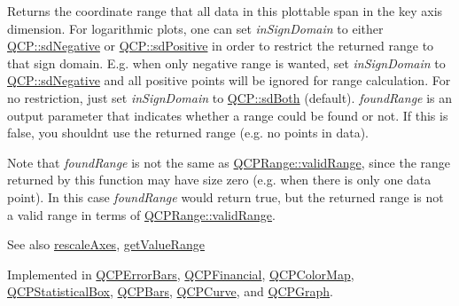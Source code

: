 Returns the coordinate range that all data in this plottable span in the key axis dimension. For logarithmic plots, one can set {\itshape in\+Sign\+Domain} to either \mbox{\hyperlink{namespace_q_c_p_afd50e7cf431af385614987d8553ff8a9a2d18af0bc58f6528d1e82ce699fe4829}{Q\+C\+P\+::sd\+Negative}} or \mbox{\hyperlink{namespace_q_c_p_afd50e7cf431af385614987d8553ff8a9a584784b75fb816abcc627cf743bb699f}{Q\+C\+P\+::sd\+Positive}} in order to restrict the returned range to that sign domain. E.\+g. when only negative range is wanted, set {\itshape in\+Sign\+Domain} to \mbox{\hyperlink{namespace_q_c_p_afd50e7cf431af385614987d8553ff8a9a2d18af0bc58f6528d1e82ce699fe4829}{Q\+C\+P\+::sd\+Negative}} and all positive points will be ignored for range calculation. For no restriction, just set {\itshape in\+Sign\+Domain} to \mbox{\hyperlink{namespace_q_c_p_afd50e7cf431af385614987d8553ff8a9aa38352ef02d51ddfa4399d9551566e24}{Q\+C\+P\+::sd\+Both}} (default). {\itshape found\+Range} is an output parameter that indicates whether a range could be found or not. If this is false, you shouldn\textquotesingle{}t use the returned range (e.\+g. no points in data).

Note that {\itshape found\+Range} is not the same as \mbox{\hyperlink{class_q_c_p_range_ab38bd4841c77c7bb86c9eea0f142dcc0}{Q\+C\+P\+Range\+::valid\+Range}}, since the range returned by this function may have size zero (e.\+g. when there is only one data point). In this case {\itshape found\+Range} would return true, but the returned range is not a valid range in terms of \mbox{\hyperlink{class_q_c_p_range_ab38bd4841c77c7bb86c9eea0f142dcc0}{Q\+C\+P\+Range\+::valid\+Range}}.

\begin{DoxySeeAlso}{See also}
\mbox{\hyperlink{class_q_c_p_abstract_plottable_a1491c4a606bccd2d09e65e11b79eb882}{rescale\+Axes}}, \mbox{\hyperlink{class_q_c_p_abstract_plottable_a4de773988b21ed090fddd27c6a3a3dcb}{get\+Value\+Range}} 
\end{DoxySeeAlso}


Implemented in \mbox{\hyperlink{class_q_c_p_error_bars_a6cac828a430d66ac77a167549d01d212}{Q\+C\+P\+Error\+Bars}}, \mbox{\hyperlink{class_q_c_p_financial_a15d68fb257113fef697356d65fa76559}{Q\+C\+P\+Financial}}, \mbox{\hyperlink{class_q_c_p_color_map_a985861974560f950af6cb7fae8c46267}{Q\+C\+P\+Color\+Map}}, \mbox{\hyperlink{class_q_c_p_statistical_box_a77d2d13301dfe60c13adfaa17fc1802f}{Q\+C\+P\+Statistical\+Box}}, \mbox{\hyperlink{class_q_c_p_bars_ac5a3854774d9d9cd129b1eae1426de2d}{Q\+C\+P\+Bars}}, \mbox{\hyperlink{class_q_c_p_curve_a22d09087f78f254731197cc0b8783299}{Q\+C\+P\+Curve}}, and \mbox{\hyperlink{class_q_c_p_graph_aac47c6189e3aea46ea46939e5d14796c}{Q\+C\+P\+Graph}}.

